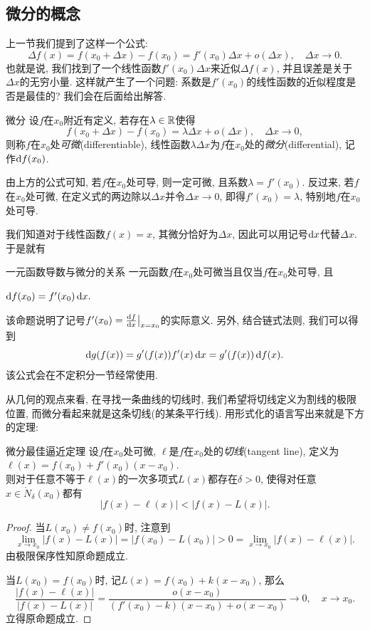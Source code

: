 \subsection{微分的概念}

上一节我们提到了这样一个公式: $$\Delta f(x) = f(x_0+\Delta x) - f(x_0) = f'(x_0) \Delta x + o(\Delta x),\quad \Delta x \to 0. $$
也就是说, 我们找到了一个线性函数$f'(x_0)\Delta x$来近似$\Delta f(x)$, 并且误差是关于$\Delta x$的无穷小量. 这样就产生了一个问题: 系数是$f'(x_0)$的线性函数的近似程度是否是最佳的? 我们会在后面给出解答. 

\begin{definition}{微分}
	设$f$在$x_0$附近有定义, 若存在$\lambda \in \mathbb{R}$使得$$f(x_0+\Delta x)-f(x_0) = \lambda \Delta x+o(\Delta x),\quad \Delta x \to 0,$$
	则称$f$在$x_0$处\textit{可微}(differentiable), 线性函数$\lambda \Delta x$为$f$在$x_0$处的\textit{微分}(differential), 记作$\mathop{}\!\mathrm{d} f(x_0)$. 
\end{definition}

由上方的公式可知, 若$f$在$x_0$处可导, 则一定可微, 且系数$\lambda = f'(x_0)$. 反过来, 若$f$在$x_0$处可微, 在定义式的两边除以$\Delta x$并令$\Delta x \to 0$, 即得$f'(x_0) = \lambda$, 特别地$f$在$x_0$处可导. 

我们知道对于线性函数$f(x)=x$, 其微分恰好为$\Delta x$, 因此可以用记号$\mathop{}\!\mathrm{d} x$代替$\Delta x$. 于是就有

\begin{proposition}{一元函数导数与微分的关系}
	一元函数$f$在$x_0$处可微当且仅当$f$在$x_0$处可导, 且
	\begin{center}
		$\mathop{}\!\mathrm{d} f(x_0) = f'(x_0) \mathop{}\!\mathrm{d} x. $
	\end{center}
\end{proposition}

该命题说明了记号$f'(x_0) = \frac{\mathop{}\!\mathrm{d} f}{\mathop{}\!\mathrm{d} x} \big|_{x=x_0}$的实际意义. 另外, 结合链式法则, 我们可以得到$$\mathop{}\!\mathrm{d} g(f(x)) = g'(f(x)) f'(x)\mathop{}\!\mathrm{d} x = g'(f(x)) \mathop{}\!\mathrm{d} f(x). $$
该公式会在不定积分一节经常使用. 

从几何的观点来看, 在寻找一条曲线的切线时, 我们希望将切线定义为割线的极限位置, 而微分看起来就是这条切线(的某条平行线). 用形式化的语言写出来就是下方的定理: 

\begin{theorem}{微分最佳逼近定理}
	设$f$在$x_0$处可微, $\ell$是$f$在$x_0$处的\textit{切线}(tangent line), 定义为$\ell (x) = f(x_0)+f'(x_0)(x-x_0). $ \\
	则对于任意不等于$\ell (x)$的一次多项式$L(x)$都存在$\delta >0$, 使得对任意$x \in \mathring{N}_{\delta}(x_0)$都有
		$$|f(x)-\ell (x)| < |f(x)-L(x)|.$$
\end{theorem}
\begin{proof}
	当$L(x_0) \neq f(x_0)$时, 注意到$$\lim_{x \to x_0} |f(x) - L(x)| = |f(x_0)-L(x_0)|>0=\lim_{x\to x_0}|f(x)-\ell (x)|.$$
	由极限保序性知原命题成立. 
	
	当$L(x_0) = f(x_0)$时, 记$L(x)=f(x_0)+k(x-x_0)$, 那么$$\frac{|f(x)-\ell (x)|}{|f(x)-L(x)|} = \frac{o(x-x_0)}{(f'(x_0)-k)(x-x_0)+o(x-x_0)} \to 0,\quad x \to x_0. $$
	立得原命题成立. 
\end{proof}

